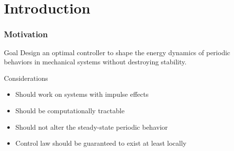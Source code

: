 \section{Introduction}
\showtoc


\begin{frame}[t]
  \frametitle{Motivation}
   {
    \begin{block}{Goal}
      Design an optimal controller to shape the energy dynamics of periodic
      behaviors in mechanical systems without destroying stability.
    \end{block}

    \begin{block}{Considerations}
      \begin{itemize}
      \item Should work on systems with impulse effects
      \item Should be computationally tractable
      \item Should not alter the steady-state periodic behavior
      \item Control law should be guaranteed to exist at least locally
      \end{itemize}
    \end{block}
  }

\end{frame}
